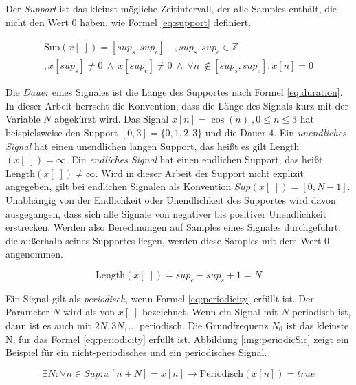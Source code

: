 Der \emph{Support} ist das kleinst mögliche Zeitintervall, der alle Samples enthält, die nicht den Wert 0 haben, wie Formel \ref{eq:support} definiert. 

\begin{equation}
\label{eq:support}
\begin{split}
\text{Sup}(x[\;]) = [sup_s, sup_e] \quad , sup_s, sup_e \in \mathbb{Z} \\,  x[sup_s] \neq 0 \:  \wedge \:  x[sup_e] \neq 0 \: \wedge \: \forall n \
\not\in [sup_s, sup_e] : x[n] = 0
\end{split}
\end{equation}

Die \emph{Dauer} eines Signales ist die Länge des Supportes nach Formel \ref{eq:duration}. In dieser Arbeit herrscht die Konvention, dass die Länge des Signals kurz mit der Variable $N$ abgekürzt wird. Das Signal $x[n] = \cos(n) \: ,0\leq n \leq 3$ hat beispielsweise den Support $[0,3] = \{0,1,2,3\} $ und die Dauer $4$. Ein \emph{unendliches Signal} hat einen unendlichen langen Support, das heißt es gilt Length$(x[\;]) = \infty$. Ein \emph{endliches Signal} hat einen endlichen Support, das heißt Length$(x[\;]) \neq\infty$. Wird in dieser Arbeit der Support nicht explizit angegeben, gilt bei endlichen Signalen als Konvention $Sup(x[\;]) = [0,N-1]$. Unabhängig von der Endlichkeit oder Unendlichkeit des Supportes wird davon ausgegangen, dass sich alle Signale von negativer bis positiver Unendlichkeit erstrecken. Werden also Berechnungen auf Samples eines Signales durchgeführt, die außerhalb seines Supportes liegen, werden diese Samples mit dem Wert 0 angenommen. \cite[S. 24]{dspMichigan}

\begin{equation}
\text{Length}(x[\;]) = sup_e - sup_s + 1 = N
\label{eq:duration}
\end{equation}

Ein Signal gilt als \emph{periodisch}, wenn Formel \ref{eq:periodicity} erfüllt ist. Der Parameter $N$ wird als  von $x[\;]$ bezeichnet. Wenn ein Signal mit $N$ periodisch ist, dann ist es auch mit $2N, 3N, \ldots $ periodisch. Die Grundfrequenz $N_0$ ist das kleinste N, für das Formel \ref{eq:periodicity} erfüllt ist. Abbildung \ref{img:periodicSic} zeigt ein Beispiel für ein nicht-periodisches und ein periodisches Signal. \cite[S. 24]{dspMichigan}

\begin{equation}
\exists N : \forall n \in Sup : x[n+N] = x[n] \rightarrow \text{Periodisch}(x[n]) = true
\label{eq:periodicity}
\end{equation}

